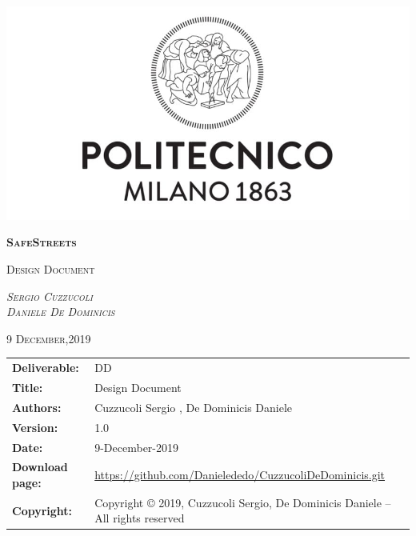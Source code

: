 




\begin{titlepage}
	\centering
	\includegraphics[width=\textwidth]{Images/PolimiLogo}\par\vspace{1cm}
	{\scshape\Huge\textbf{SafeStreets}\par}
	\vspace{1cm}
	{\scshape\Large Design Document\par}
	\vspace{2cm}
	{\scshape\Large\emph{Sergio Cuzzucoli}\\ \emph{Daniele De Dominicis}\par}
	\vspace{4cm}
	{\scshape\normalsize{9 December,2019}}

\end{titlepage}

\begin{table}[h!]
\begin{tabu} to \textwidth { X[0.3,r,p] X[0.7,l,p] }
\hline

\textbf{Deliverable:} & DD\\
\textbf{Title:} & Design Document \\
\textbf{Authors:} & Cuzzucoli Sergio , De Dominicis Daniele \\
\textbf{Version:} & 1.0 \\ 
\textbf{Date:} & 9-December-2019  \\
\textbf{Download page:} & \href{https://github.com/Danielededo/CuzzucoliDeDominicis.git}{https://github.com/Danielededo/CuzzucoliDeDominicis.git} \\
\textbf{Copyright:} & Copyright © 2019, Cuzzucoli Sergio, De Dominicis Daniele – All rights reserved \\
\hline
\end{tabu}
\end{table}

